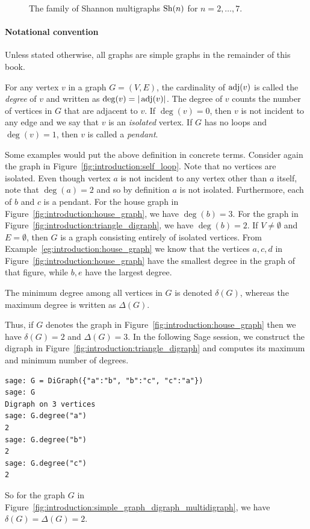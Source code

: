 \begin{figure}[!htbp]
\centering
{}

\caption{The family of Shannon multigraphs $\operatorname*{Sh}(n)$ for $n = 2,\dots,7$.}
\label{fig:introduction:Shannon_multigraphs}
\end{figure}

\paragraph{Notational convention}
Unless stated otherwise, all graphs are simple graphs in the remainder
of this book.

\begin{definition}
\rm
For any vertex $v$ in a graph $G = (V, E)$, the
cardinality of $\operatorname*{adj}(v)$ is called the
\emph{degree} of $v$ and written as
$\deg(v) = |\operatorname*{adj}(v)|$\index{$\deg$}. The degree of $v$ counts the
number of vertices in $G$ that are adjacent to $v$. If $\deg(v) = 0$,
then $v$ is not incident to any edge and we say that $v$ is an
\emph{isolated} vertex. If $G$ has no loops
and $\deg(v) = 1$, then $v$ is called a
\emph{pendant}.
\end{definition}

Some examples would put the above definition in concrete
terms. Consider again the graph in
Figure~\ref{fig:introduction:self_loop}. Note that no vertices are
isolated. Even though vertex $a$ is not incident to any vertex other
than $a$ itself, note that $\deg(a) = 2$ and so by definition $a$ is
not isolated. Furthermore, each of $b$ and $c$ is a pendant. For the
house graph in Figure~\ref{fig:introduction:house_graph}, we have
$\deg(b) = 3$. For the graph in
Figure~\ref{fig:introduction:triangle_digraph}, we have
$\deg(b) = 2$. If $V \neq \emptyset$ and $E = \emptyset$, then
$G$ is a graph consisting entirely of isolated vertices. From
Example~\ref{eg:introduction:house_graph} we know that the vertices
$a, c, d$ in Figure~\ref{fig:introduction:house_graph} have the
smallest degree in the graph of that figure, while $b, e$ have the
largest degree.

The minimum degree among
all vertices in $G$ is denoted $\delta(G)$, whereas
the maximum degree is written as
$\Delta(G)$.

Thus, if $G$ denotes the graph in
Figure~\ref{fig:introduction:house_graph} then we have $\delta(G) = 2$
and $\Delta(G) = 3$. In the following Sage session, we construct the
digraph in Figure~\ref{fig:introduction:triangle_digraph} and computes
its maximum and minimum number of degrees.
\begin{lstlisting}
sage: G = DiGraph({"a":"b", "b":"c", "c":"a"})
sage: G
Digraph on 3 vertices
sage: G.degree("a")
2
sage: G.degree("b")
2
sage: G.degree("c")
2
\end{lstlisting}
So for the graph $G$ in
Figure~\ref{fig:introduction:simple_graph_digraph_multidigraph}, we have
$\delta(G) = \Delta(G) = 2$.


